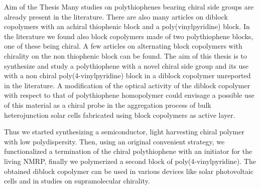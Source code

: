 \begin{section}{Aim of the Thesis}
Many studies on polythiophenes bearing chiral side groups are already present in the literature. 
There are also many articles on diblock copolymers with an achiral thiophenic block and a poly\-(vinyl\-pyridine) block. In the literature we found also block copolymers made of two polythiophene blocks, one of these being chiral. A few articles on alternating block copolymers with chirality on the non thiophenic block can be found. The aim of this thesis is to synthesize and study a polythiophene with a novel chiral side group and its use with a non chiral poly(4-vinyl\-pyridine) block in a diblock copolymer unreported in the literature. 
A modification of the optical activity of the di\-block copolymer with respect to that of polythiophene homo\-polymer could envisage a possible use of this material as a chiral probe in the aggregation process of bulk hetero\-junction solar cells fabricated using block copolymers as active layer.

Thus we started synthesizing a semiconductor, light harvesting chiral polymer with low polydispersity. Then, using an original convenient strategy, we functionalized a termination of the chiral polythiophene with an initiator for the living \gls{NMRP}, finally we polymerized a second block of poly\-(4-vinyl\-pyridine). The obtained diblock copolymer can be used in various devices like solar photovoltaic cells and in studies on supramolecular chirality.

\end{section}
